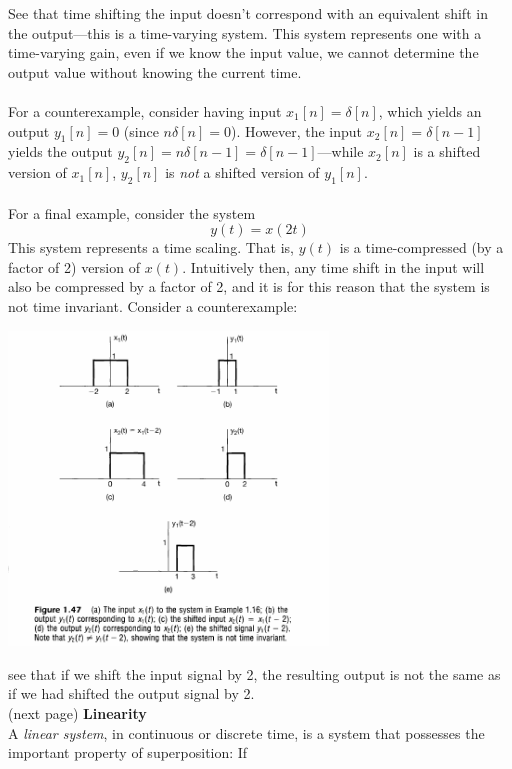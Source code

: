 \documentclass{report}
\begin{document}
See that time shifting the input doesn't correspond with an equivalent shift in the output---this is a time-varying system. 
This system represents one with a time-varying gain, even if we know the input value, we cannot determine the output value 
without knowing the current time.\\
\vspace{1mm}\\
For a counterexample, consider having input $x_1[n]=\delta[n]$, which yields an output $y_1[n]=0$ (since $n\delta[n]=0$). 
However, the input $x_2[n]=\delta[n-1]$ yields the output $y_2[n]=n\delta[n-1]=\delta[n-1]$---while $x_2[n]$ is a shifted 
version of $x_1[n]$, $y_2[n]$ is \textit{not} a shifted version of $y_1[n]$.\\
\vspace{1mm}\\
For a final example, consider the system
\begin{equation*}
y(t)=x(2t)
\end{equation*}
This system represents a time scaling. That is, $y(t)$ is a time-compressed (by a factor of 2) version of $x(t)$.
Intuitively then, any time shift in the input will also be compressed by a factor of 2, and it is for this reason that the system 
is not time invariant. Consider a counterexample: 
\begin{center}
\includegraphics[width=8.5cm]{a14}
\end{center}
see that
if we shift the input signal by 2, the resulting output is not the same as if we had shifted the output signal by 2.\\
(next page)\newpage
\noindent\textbf{Linearity}\\
A \textit{linear system}, in continuous or discrete time, is a system that possesses the important property of superposition: If
\end{document}
